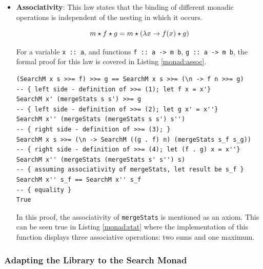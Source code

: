 \begin{itemize}
\begin{lstlisting}[style = haskell, caption = Right identity formal proof for
\texttt{SearchM}, label = monad:rightid]
SearchM x s >>= (\n -> return n) == SearchM x s
-- { definition of return, where s_id :: Statistics with identity value }
SearchM x s >>= (\n -> SearchM n s_id) == SearchM x s
-- { definition of >>= }
SearchM x (mergeStats s_id s) == SearchM x s
-- { applying identity of s_id }
SearchM x s == SearchM x s
-- { equality }
True
\end{lstlisting}

\item \textbf{Associativity}: This law states that the binding of different
  monadic operations is independent of the nesting in which it occurs.

  $$
  m \star f \star g = m \star (\lambda x \rightarrow f(x) \star g)\\
  $$

  For a variable \texttt{x :: a}, and functions \texttt{f :: a -> m b},
  \texttt{g :: a -> m b}, the formal proof for this law is covered in Listing
  \ref{monad:assoc}.

\begin{lstlisting}[style = haskell, caption = Associativity formal proof for
\texttt{SearchM}, label = monad:assoc]
(SearchM x s >>= f) >>= g == SearchM x s >>= (\n -> f n >>= g)
-- { left side - definition of >>= (1); let f x = x'}
SearchM x' (mergeStats s s') >>= g
-- { left side - definition of >>= (2); let g x' = x''}
SearchM x'' (mergeStats (mergeStats s s') s'')
-- { right side - definition of >>= (3); }
SearchM x s >>= (\n -> SearchM ((g . f) n) (mergeStats s_f s_g))
-- { right side - definition of >>= (4); let (f . g) x = x''}
SearchM x'' (mergeStats (mergeStats s' s'') s)
-- { assuming associativity of mergeStats, let result be s_f }
SearchM x'' s_f == SearchM x'' s_f
-- { equality }
True
\end{lstlisting}

  In this proof, the associativity of \texttt{mergeStats} is mentioned as an
  axiom. This can be seen true in Listing \ref{monad:stat} where the
  implementation of this function displays three associative operations: two
  sums and one maximum.\\
  
\end{itemize}


\subsubsection{Adapting the Library to the Search Monad}

